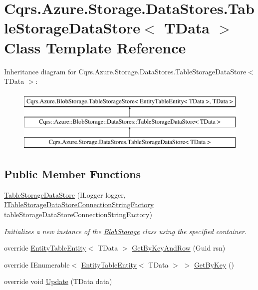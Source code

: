 \hypertarget{classCqrs_1_1Azure_1_1Storage_1_1DataStores_1_1TableStorageDataStore}{}\section{Cqrs.\+Azure.\+Storage.\+Data\+Stores.\+Table\+Storage\+Data\+Store$<$ T\+Data $>$ Class Template Reference}
\label{classCqrs_1_1Azure_1_1Storage_1_1DataStores_1_1TableStorageDataStore}
Inheritance diagram for Cqrs.\+Azure.\+Storage.\+Data\+Stores.\+Table\+Storage\+Data\+Store$<$ T\+Data $>$\+:\begin{figure}[H]
\begin{center}
\leavevmode
\includegraphics[height=3.000000cm]{classCqrs_1_1Azure_1_1Storage_1_1DataStores_1_1TableStorageDataStore}
\end{center}
\end{figure}
\subsection*{Public Member Functions}
\begin{DoxyCompactItemize}
\item 
\hyperlink{classCqrs_1_1Azure_1_1Storage_1_1DataStores_1_1TableStorageDataStore_a25a32a83c14eb5068f5bc9bcacfa15f6}{Table\+Storage\+Data\+Store} (I\+Logger logger, \hyperlink{interfaceCqrs_1_1Azure_1_1BlobStorage_1_1DataStores_1_1ITableStorageDataStoreConnectionStringFactory}{I\+Table\+Storage\+Data\+Store\+Connection\+String\+Factory} table\+Storage\+Data\+Store\+Connection\+String\+Factory)
\begin{DoxyCompactList}\small\item\em Initializes a new instance of the \hyperlink{namespaceCqrs_1_1Azure_1_1BlobStorage}{Blob\+Storage} class using the specified container. \end{DoxyCompactList}\item 
override \hyperlink{classCqrs_1_1Azure_1_1BlobStorage_1_1EntityTableEntity}{Entity\+Table\+Entity}$<$ T\+Data $>$ \hyperlink{classCqrs_1_1Azure_1_1Storage_1_1DataStores_1_1TableStorageDataStore_a61e3fc6404283606ec41a5e5a3c72ac8}{Get\+By\+Key\+And\+Row} (Guid rsn)
\item 
override I\+Enumerable$<$ \hyperlink{classCqrs_1_1Azure_1_1BlobStorage_1_1EntityTableEntity}{Entity\+Table\+Entity}$<$ T\+Data $>$ $>$ \hyperlink{classCqrs_1_1Azure_1_1Storage_1_1DataStores_1_1TableStorageDataStore_a79043a9d497f4027cf87e5ff78fe6098}{Get\+By\+Key} ()
\item 
override void \hyperlink{classCqrs_1_1Azure_1_1Storage_1_1DataStores_1_1TableStorageDataStore_a9afab2cca66ca4453b2ab56916578c7d}{Update} (T\+Data data)
\end{DoxyCompactItemize}
